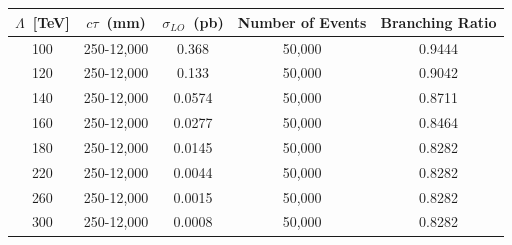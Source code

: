 \paragraph*{}\mbox{}\\
\begin{minipage}{\linewidth} 
\begin{center}
\centering
\begin{tabular}{c c c c c}
       \toprule
        \hline
        $\Lambda$~[TeV] & $c\tau$~(mm) & $\sigma_{LO}$~(pb) & \bfseries{Number of Events} & \bfseries{Branching Ratio}\\
       \hline
       100 & 250-12,000  & 0.368  & 50,000 & 0.9444\\
       120 & 250-12,000  & 0.133  & 50,000 & 0.9042\\
       140 & 250-12,000  & 0.0574 & 50,000 & 0.8711\\
       160 & 250-12,000  & 0.0277 & 50,000 & 0.8464\\
       180 & 250-12,000  & 0.0145 & 50,000 & 0.8282\\
       220 & 250-12,000  & 0.0044 & 50,000 & 0.8282\\
       260 & 250-12,000  & 0.0015 & 50,000 & 0.8282\\
       300 & 250-12,000  & 0.0008 & 50,000 & 0.8282\\
       \hline
       \bottomrule
       \end{tabular}  
\label{tab:mc_GMSB_sample}
\end{center}
\end{minipage}
